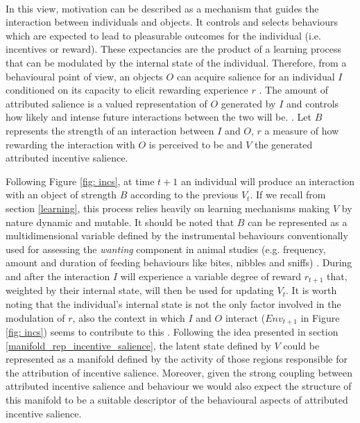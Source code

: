 \\
In this view, motivation can be described as a mechanism that guides the interaction between individuals and objects. It controls and selects behaviours which are expected to lead to pleasurable outcomes for the individual (i.e. incentives or reward). These expectancies are the product of a learning process that can be modulated by the internal state of the individual. Therefore, from a behavioural point of view, an objects $O$ can acquire salience for an individual $I$ conditioned on its capacity to elicit rewarding experience $r$ \cite{berridge1998role,mcclure2003computational}. The amount of attributed salience is a valued representation of $O$ generated by $I$ and controls how likely and intense future interactions between the two will be. \cite{berridge1998role,mcclure2003computational}. Let $B$ represents the strength of an interaction between $I$ and $O$, $r$ a measure of how rewarding the interaction with $O$ is perceived to be and $V$ the generated attributed incentive salience.

Following Figure \ref{fig: incs}, at time $t+1$ an individual will produce an interaction with an object of strength $B$ according to the previous $V_{t}$. If we recall from section \ref{learning}, this process relies heavily on learning mechanisms making $V$ by nature dynamic and mutable. It should be noted that $B$ can be represented as a multidimensional variable defined by the instrumental behaviours conventionally used for assessing the \emph{wanting} component in animal studies (e.g. frequency, amount and duration of feeding behaviours like bites, nibbles and sniffs) \cite{berridge1998role}. During and after the interaction $I$ will experience a variable degree of reward $r_{t+1}$ that, weighted by their internal state, will then be used for updating $V_{t}$.  It is worth noting that the individual's internal state is not the only factor involved in the modulation of $r$, also the context in which $I$ and $O$ interact ($Env_{t+1}$ in Figure \ref{fig: incs}) seems to contribute to this \cite{palminteri2015contextual}. Following the idea presented in section \ref{manifold_rep_incentive_salience}, the latent state defined by $V$ could be represented as a manifold defined by the activity of those regions responsible for the attribution of incentive salience. Moreover, given the strong coupling between attributed incentive salience and behaviour \cite{berridge1998role} we would also expect the structure of this manifold to be a suitable descriptor of the behavioural aspects of attributed incentive salience.

